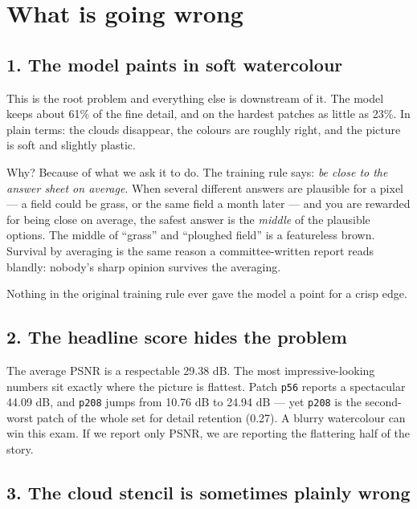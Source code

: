 \documentclass[11pt,a4paper]{article}
\newcommand{\code}[1]{\texttt{#1}}
\begin{document}
\section{What is going wrong}
\label{sec:wrong}

\subsection{1. The model paints in soft watercolour}

This is the root problem and everything else is downstream of it. The model keeps about 61\% of the
fine detail, and on the hardest patches as little as 23\%. In plain terms: the clouds disappear, the
colours are roughly right, and the picture is soft and slightly plastic.

Why? Because of what we ask it to do. The training rule says: \emph{be close to the answer sheet on
average}. When several different answers are plausible for a pixel --- a field could be grass, or
the same field a month later --- and you are rewarded for being close on average, the safest answer
is the \emph{middle} of the plausible options. The middle of ``grass'' and ``ploughed field'' is a
featureless brown. Survival by averaging is the same reason a committee-written report reads
blandly: nobody's sharp opinion survives the averaging.

Nothing in the original training rule ever gave the model a point for a crisp edge.

\subsection{2. The headline score hides the problem}

The average PSNR is a respectable 29.38 dB. The most impressive-looking numbers sit exactly where
the picture is flattest. Patch \code{p56} reports a spectacular 44.09 dB, and \code{p208} jumps
from 10.76 dB to 24.94 dB --- yet \code{p208} is the second-worst patch of the whole set for detail
retention (0.27). A blurry watercolour can win this exam. If we report only PSNR, we are reporting
the flattering half of the story.

\subsection{3. The cloud stencil is sometimes plainly wrong}
\end{document}
